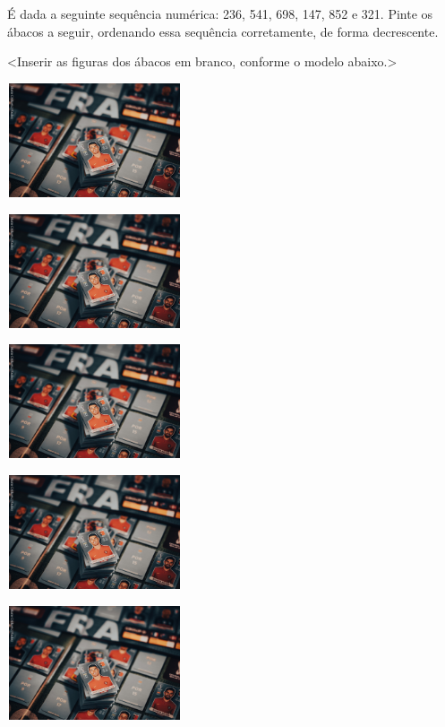 É dada a seguinte sequência numérica: 236, 541, 698, 147, 852 e 321. Pinte os
ábacos a seguir, ordenando essa sequência corretamente, de forma
decrescente.

\textless{}Inserir as figuras dos ábacos em branco, conforme o modelo
abaixo.\textgreater{}

\includegraphics[width=2.03125in,height=1.32438in]{media/image17.png}

\includegraphics[width=2.03125in,height=1.32438in]{media/image17.png}

\includegraphics[width=2.03125in,height=1.32438in]{media/image17.png}

\includegraphics[width=2.03125in,height=1.32438in]{media/image17.png}

\includegraphics[width=2.03125in,height=1.32438in]{media/image17.png}

